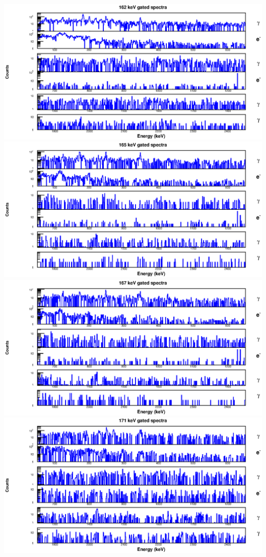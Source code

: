 \begin{landscape}
\includegraphics[scale=1.2]{154Gd_Appendix/162_combined.eps}
\includegraphics[scale=1.2]{154Gd_Appendix/165_combined.eps}
\includegraphics[scale=1.2]{154Gd_Appendix/167_combined.eps}
\includegraphics[scale=1.2]{154Gd_Appendix/171_combined.eps}

\end{landscape}
